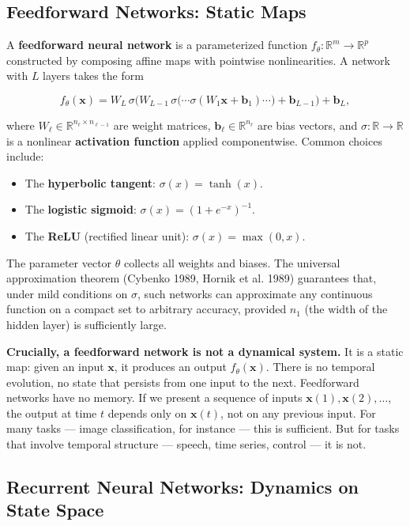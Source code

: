 \subsection{Feedforward Networks: Static Maps}\label{sec:13.2.1}

A \textbf{feedforward neural network} is a parameterized function $f_\theta: \mathbb{R}^m \to \mathbb{R}^p$ constructed by composing affine maps with pointwise nonlinearities. A network with $L$ layers takes the form

\[
f_\theta(\mathbf{x}) = W_L \,\sigma\!\big(W_{L-1}\,\sigma\!\big(\cdots \sigma(W_1 \mathbf{x} + \mathbf{b}_1) \cdots\big) + \mathbf{b}_{L-1}\big) + \mathbf{b}_L,
\]

where $W_\ell \in \mathbb{R}^{n_{\ell} \times n_{\ell-1}}$ are weight matrices, $\mathbf{b}_\ell \in \mathbb{R}^{n_\ell}$ are bias vectors, and $\sigma: \mathbb{R} \to \mathbb{R}$ is a nonlinear \textbf{activation function} applied componentwise. Common choices include:

\begin{itemize}[nosep]
  \item The \textbf{hyperbolic tangent}: $\sigma(x) = \tanh(x)$.
  \item The \textbf{logistic sigmoid}: $\sigma(x) = (1 + e^{-x})^{-1}$.
  \item The \textbf{ReLU} (rectified linear unit): $\sigma(x) = \max(0, x)$.
\end{itemize}

The parameter vector $\theta$ collects all weights and biases. The universal approximation theorem (Cybenko 1989, Hornik et al. 1989) guarantees that, under mild conditions on $\sigma$, such networks can approximate any continuous function on a compact set to arbitrary accuracy, provided $n_1$ (the width of the hidden layer) is sufficiently large.

\textbf{Crucially, a feedforward network is not a dynamical system.} It is a static map: given an input $\mathbf{x}$, it produces an output $f_\theta(\mathbf{x})$. There is no temporal evolution, no state that persists from one input to the next. Feedforward networks have no memory. If we present a sequence of inputs $\mathbf{x}(1), \mathbf{x}(2), \ldots$, the output at time $t$ depends only on $\mathbf{x}(t)$, not on any previous input. For many tasks --- image classification, for instance --- this is sufficient. But for tasks that involve temporal structure --- speech, time series, control --- it is not.

\subsection{Recurrent Neural Networks: Dynamics on State Space}\label{sec:13.2.2}

